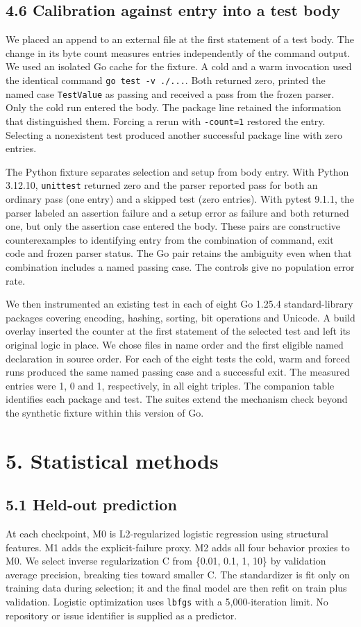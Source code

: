 \documentclass[10pt,a4paper]{article}
\begin{document}
\subsection{4.6 Calibration against entry into a test body}
We placed an append to an external file at the first statement of a test body. The change in its byte count measures entries independently of the command output. We used an isolated Go cache for the fixture. A cold and a warm invocation used the identical command \texttt{go test -v ./...}. Both returned zero, printed the named case \texttt{TestValue} as passing and received a pass from the frozen parser. Only the cold run entered the body. The package line retained the information that distinguished them. Forcing a rerun with \texttt{-count=1} restored the entry. Selecting a nonexistent test produced another successful package line with zero entries.

The Python fixture separates selection and setup from body entry. With Python 3.12.10, \texttt{unittest} returned zero and the parser reported pass for both an ordinary pass (one entry) and a skipped test (zero entries). With pytest 9.1.1, the parser labeled an assertion failure and a setup error as failure and both returned one, but only the assertion case entered the body. These pairs are constructive counterexamples to identifying entry from the combination of command, exit code and frozen parser status. The Go pair retains the ambiguity even when that combination includes a named passing case. The controls give no population error rate.

We then instrumented an existing test in each of eight Go 1.25.4 standard-library packages covering encoding, hashing, sorting, bit operations and Unicode. A build overlay inserted the counter at the first statement of the selected test and left its original logic in place. We chose files in name order and the first eligible named declaration in source order. For each of the eight tests the cold, warm and forced runs produced the same named passing case and a successful exit. The measured entries were 1, 0 and 1, respectively, in all eight triples. The companion table identifies each package and test. The suites extend the mechanism check beyond the synthetic fixture within this version of Go.

\section{5. Statistical methods}
\subsection{5.1 Held-out prediction}
At each checkpoint, M0 is L2-regularized logistic regression using structural features. M1 adds the explicit-failure proxy. M2 adds all four behavior proxies to M0. We select inverse regularization C from \{0.01, 0.1, 1, 10\} by validation average precision, breaking ties toward smaller C. The standardizer is fit only on training data during selection; it and the final model are then refit on train plus validation. Logistic optimization uses \texttt{lbfgs} with a 5,000-iteration limit. No repository or issue identifier is supplied as a predictor.
\end{document}

